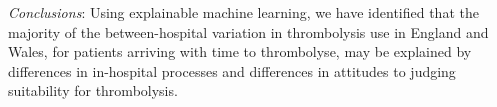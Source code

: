 
\emph{Conclusions}: Using explainable machine learning, we have identified that the majority of the between-hospital variation in thrombolysis use in England and Wales, for patients arriving with time to thrombolyse, may be explained by differences in in-hospital processes and differences in attitudes to judging suitability for thrombolysis.